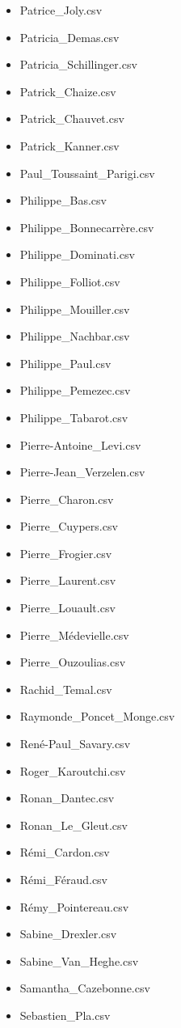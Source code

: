 \documentclass[a4paper,12pt,twoside]{book}
\begin{document}
\begin{itemize}
  \item Patrice\_Joly.csv
  \item Patricia\_Demas.csv
  \item Patricia\_Schillinger.csv
  \item Patrick\_Chaize.csv
  \item Patrick\_Chauvet.csv
  \item Patrick\_Kanner.csv
  \item Paul\_Toussaint\_Parigi.csv
  \item Philippe\_Bas.csv
  \item Philippe\_Bonnecarrère.csv
  \item Philippe\_Dominati.csv
  \item Philippe\_Folliot.csv
  \item Philippe\_Mouiller.csv
  \item Philippe\_Nachbar.csv
  \item Philippe\_Paul.csv
  \item Philippe\_Pemezec.csv
  \item Philippe\_Tabarot.csv
  \item Pierre-Antoine\_Levi.csv
  \item Pierre-Jean\_Verzelen.csv
  \item Pierre\_Charon.csv
  \item Pierre\_Cuypers.csv
  \item Pierre\_Frogier.csv
  \item Pierre\_Laurent.csv
  \item Pierre\_Louault.csv
  \item Pierre\_Médevielle.csv
  \item Pierre\_Ouzoulias.csv
  \item Rachid\_Temal.csv
  \item Raymonde\_Poncet\_Monge.csv
  \item René-Paul\_Savary.csv
  \item Roger\_Karoutchi.csv
  \item Ronan\_Dantec.csv
  \item Ronan\_Le\_Gleut.csv
  \item Rémi\_Cardon.csv
  \item Rémi\_Féraud.csv
  \item Rémy\_Pointereau.csv
  \item Sabine\_Drexler.csv
  \item Sabine\_Van\_Heghe.csv
  \item Samantha\_Cazebonne.csv
  \item Sebastien\_Pla.csv

\end{itemize}
\end{document}
